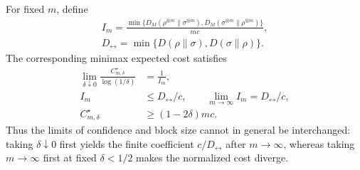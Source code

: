 \begin{theorem}
\label{thm:memory-limits}
For fixed $m$, define
\[
 \begin{gathered}
 I_m=\frac{\min\{D_M(\rho^{\otimes m}\|\sigma^{\otimes m}),
                         D_M(\sigma^{\otimes m}\|\rho^{\otimes m})\}}{mc},
 \\
 D_{\leftrightarrow}=\min\{D(\rho\|\sigma),D(\sigma\|\rho)\}.
 \end{gathered}
\]
The corresponding minimax expected cost satisfies
\begin{align}
 \lim_{\delta\downarrow0}
 \frac{C_{m,\delta}^\star}{\log(1/\delta)}&=\frac1{I_m},\label{eq:memory-rate}\\
 I_m&\leq D_{\leftrightarrow}/c,\qquad
 \lim_{m\to\infty}I_m=D_{\leftrightarrow}/c,\label{eq:memory-regularization}\\
 C_{m,\delta}^\star&\geq(1-2\delta)mc.
 \label{eq:memory-entry}
\end{align}
Thus the limits of confidence and block size cannot in general be
interchanged: taking $\delta\downarrow0$ first yields the finite
coefficient $c/D_{\leftrightarrow}$ after $m\to\infty$, whereas taking
$m\to\infty$ first at fixed $\delta<1/2$ makes the normalized cost diverge.
\end{theorem}
